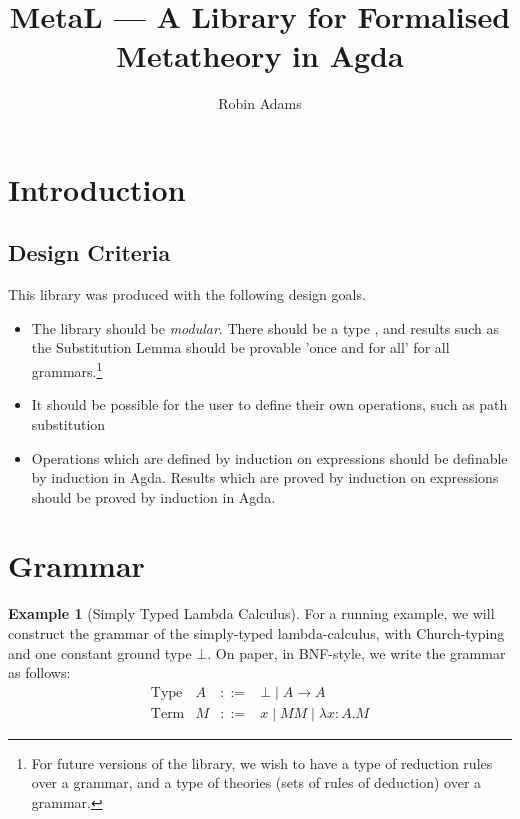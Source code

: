 \documentclass{article}
\title{MetaL --- A Library for Formalised Metatheory in Agda}
\author{Robin Adams}
\theoremstyle{definition}
\newtheorem{example}{Example}[section]
\begin{document}
\maketitle

\section{Introduction}


\subsection{Design Criteria}

This library was produced with the following design goals.

\begin{itemize}
\item
The library should be \emph{modular}.  There should be a type , and results such as the Substitution Lemma 
should be
provable 'once and for all' for all grammars.\footnote{For future versions of the library, we wish to have a type of reduction rules over a grammar, and a type of theories (sets of rules of deduction) over a grammar.}
\item
It should be possible for the user to define their own operations, such as path substitution %
\item
Operations which are defined by induction on expressions should be definable by induction in Agda.  Results which are proved by induction on expressions should be proved by induction in Agda.
\end{itemize}

\section{Grammar}

\begin{example}[Simply Typed Lambda Calculus]
\label{ex:stlc}
For a running example, we will construct the grammar of the simply-typed lambda-calculus, with Church-typing and one constant ground type $\bot$.  On paper, in BNF-style, we write the grammar as follows:
\[ \begin{array}{lrcl}
\text{Type} & A & ::= & \bot \mid A \rightarrow A \\
\text{Term} & M & ::= & x \mid MM \mid \lambda x : A . M
\end{array} \]
\end{example}
\end{document}
